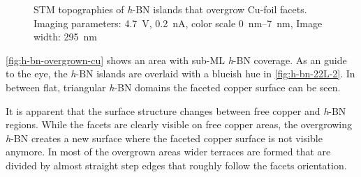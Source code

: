 	\begin{figure}[h!]
		\centering
		 \quad %
		\caption{STM topographies of \textit{h}-BN islands that overgrow Cu-foil facets. Imaging parameters: 		
			\SI{4.7}{\volt}, \SI{0.2}{\nano\ampere}, color scale \SIrange{0}{7}{\nano\meter}, Image width: \SI{295}{\nano \meter}
		}%
		\label{fig:h-bn-overgrown-cu}
	\end{figure}
\autoref{fig:h-bn-overgrown-cu} shows an area with sub-ML \textit{h}-BN coverage. As an guide to the eye, the \textit{h}-BN islands are overlaid with a blueish hue in \autoref{fig:h-bn-22L-2}. In between flat, triangular \textit{h}-BN domains the faceted copper surface can be seen.

It is apparent that the surface structure changes between free copper and \textit{h}-BN regions. While the facets are clearly visible on free copper areas, the overgrowing \textit{h}-BN creates a new surface where the faceted copper surface is not visible anymore. In most of the overgrown areas wider terraces are formed that are divided by almost straight step edges that roughly follow the facets orientation.

